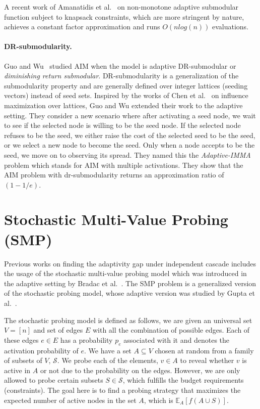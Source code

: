 A recent work of Amanatidis et al.~\cite{amanatidis} on non-monotone adaptive submodular function subject to knapsack constraints, which are more stringent by nature, achieves a constant factor approximation and runs $O(n log(n))$ evaluations.

\paragraph{DR-submodularity.} Guo and Wu~\cite{guo} studied AIM when the model is adaptive DR-submodular or \textit{diminishing return submodular}. DR-submodularity is a generalization of the submodularity property and are generally defined over integer lattices (seeding vectors) instead of seed sets. Inspired by the works of Chen et al.~\cite{drchen} on influence maximization over lattices, Guo and Wu extended their work to the adaptive setting. They consider a new scenario where after activating a seed node, we wait to see if the selected node is willing to be the seed node. If the selected node refuses to be the seed, we either raise the cost of the selected seed to be the seed, or we select a new node to become the seed. Only when a node accepts to be the seed, we move on to observing its spread. They named this the \textit{Adaptive-IMMA} problem which stands for AIM with multiple activations. They show that the AIM problem with dr-submodularity returns an approximation ratio of $(1-1/e)$.



\section{Stochastic Multi-Value Probing (SMP)}\label{smp}

Previous works on finding the adaptivity gap under independent cascade includes the usage of the stochastic multi-value probing model which was introduced in the adaptive setting by Bradac et al.~\cite{Bradac19}. The SMP problem is a generalized version of the stochastic probing model, whose adaptive version was studied by Gupta et al.~\cite{Gupta2017}.

The stochastic probing model is defined as follows, we are given an universal set $V = [n]$ and set of edges $E$ with all the combination of possible edges. Each of these edges $e \in E$ has a probability $p_e$ associated with it and denotes the activation probability of $e$. We have a set $A \subseteq V$ chosen at random from a family of subsets of $V$, $\mathcal{S}$. We probe each of the elements, $v \in A$ to reveal whether $v$ is active in $A$ or not due to the probability on the edges. However, we are only allowed to probe certain subsets $S \in \mathcal{S}$, which fulfills the budget requirements (constraints). The goal here is to find a probing strategy that maximizes the expected number of active nodes in the set $A$, which is $\mathbb{E}_A[f(A \cup S)]$.  


